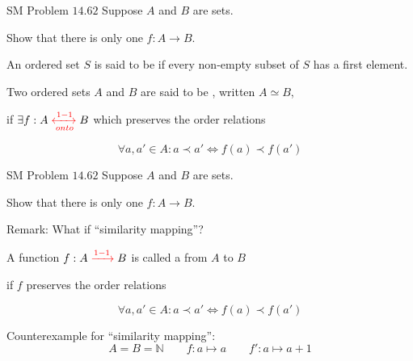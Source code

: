 \begin{frame}{}
  \begin{exampleblock}{SM Problem $14.62$}
    Suppose $A$ and $B$ are   sets. 
    
    Show that there is only one  $f : A \to B$.
  \end{exampleblock}

  \pause
  \vspace{0.50cm}
  \begin{definition}
    An ordered set $S$ is said to be  if every non-empty subset of $S$ has a first element.
  \end{definition}

  \pause
  \vspace{0.50cm}
  \begin{definition}[Isomorphic]
    Two ordered sets $A$ and $B$ are said to be , written $A \simeq B$, 

    if $\exists f: A \textcolor{red}{\;\xleftrightarrow[onto]{1-1}\;} B$ which preserves the order relations

    \[
      \forall a, a' \in A: a \prec a' \iff f(a) \prec f(a')
    \]
  \end{definition}
\end{frame}

\begin{frame}{}
  \begin{exampleblock}{SM Problem $14.62$}
    Suppose $A$ and $B$ are   sets. 
    
    Show that there is only one  $f : A \to B$.
  \end{exampleblock}

  \vspace{0.50cm}
  \begin{alertblock}{Remark: What if ``similarity mapping''?}
    \pause
    \begin{definition}
      A function $f: A \textcolor{red}{\;\xrightarrow{1-1}\;} B$ is called a  from $A$ to $B$ 

      if $f$ preserves the order relations

      \[
	\forall a, a' \in A: a \prec a' \iff f(a) \prec f(a')
      \]
    \end{definition}

    \pause
    \begin{exampleblock}{Counterexample for ``similarity mapping'':}
      \pause
      \[
	A = B = \mathbb{N}  \qquad f: a \mapsto a  \qquad f': a \mapsto a + 1
      \]
    \end{exampleblock}
  \end{alertblock}
\end{frame}

